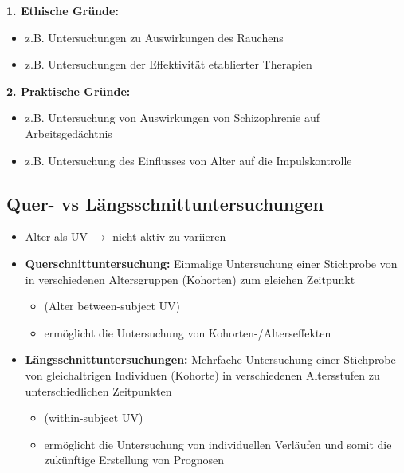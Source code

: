 \documentclass[
]{book}
\providecommand{\tightlist}{%
  \setlength{\itemsep}{0pt}\setlength{\parskip}{0pt}}
\begin{document}
\textbf{1. Ethische Gründe:}

\begin{itemize}
\tightlist
\item
  z.B. Untersuchungen zu Auswirkungen des Rauchens
\item
  z.B. Untersuchungen der Effektivität etablierter Therapien
\end{itemize}

\textbf{2. Praktische Gründe:}

\begin{itemize}
\tightlist
\item
  z.B. Untersuchung von Auswirkungen von Schizophrenie auf Arbeitsgedächtnis
\item
  z.B. Untersuchung des Einflusses von Alter auf die Impulskontrolle
\end{itemize}

\hypertarget{quer--vs-luxe4ngsschnittuntersuchungen}{%
\subsection{Quer- vs Längsschnittuntersuchungen}\label{quer--vs-luxe4ngsschnittuntersuchungen}}

\begin{itemize}
\item
  Alter als UV \(\rightarrow\) nicht aktiv zu variieren
\item
  \textbf{Querschnittuntersuchung:} Einmalige Untersuchung einer Stichprobe von in verschiedenen Altersgruppen (Kohorten) zum gleichen Zeitpunkt

  \begin{itemize}
  \tightlist
  \item
    (Alter between-subject UV)
  \item
    ermöglicht die Untersuchung von Kohorten-/Alterseffekten
  \end{itemize}
\item
  \textbf{Längsschnittuntersuchungen:} Mehrfache Untersuchung einer Stichprobe von gleichaltrigen Individuen (Kohorte) in verschiedenen Altersstufen zu unterschiedlichen Zeitpunkten

  \begin{itemize}
  \tightlist
  \item
    (within-subject UV)
  \item
    ermöglicht die Untersuchung von individuellen Verläufen und somit die zukünftige Erstellung von Prognosen
  \end{itemize}
\end{itemize}
\end{document}
